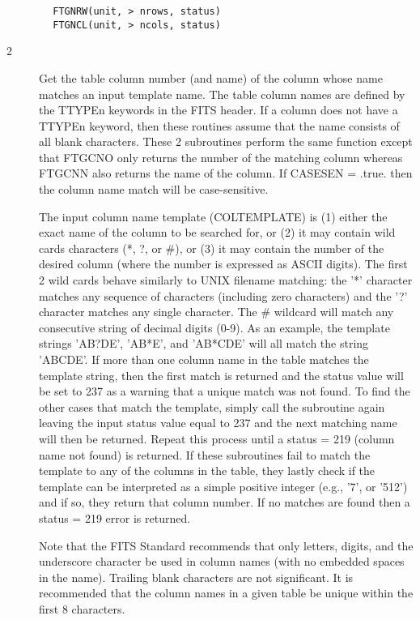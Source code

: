 \documentclass[11pt]{book}
\begin{document}
\begin{verbatim}
        FTGNRW(unit, > nrows, status)
        FTGNCL(unit, > ncols, status)
\end{verbatim}

\begin{description}
\item[2 ] Get the table column number (and name) of the column whose name
matches an input template name.  The table column names are defined by
the TTYPEn keywords in the FITS header.  If a column does not have a
TTYPEn keyword, then these routines assume that the name consists of
all blank characters.  These 2 subroutines perform the same function
except that FTGCNO only returns the number of the matching column whereas
FTGCNN also returns the name of the column.  If CASESEN = .true. then
the column name match will be case-sensitive.

The input column name template (COLTEMPLATE) is (1) either the exact
name of the column to be searched for, or (2) it may contain wild cards
characters (*, ?, or \#), or (3) it may contain the number of the desired
column (where the number is expressed as ASCII digits).  The first 2 wild
cards behave similarly to UNIX filename matching:  the '*' character matches
any sequence of characters (including zero characters) and the '?'
character matches any single character.  The \# wildcard will match
any consecutive string of decimal digits (0-9).  As an example, the template
strings 'AB?DE', 'AB*E', and 'AB*CDE' will all match the string
'ABCDE'.  If more than one column name in the table matches the
template string, then the first match is returned and the status value
will be set to 237 as a warning that a unique match was not found.  To
find the other cases that match the template, simply call the
subroutine again leaving the input status value equal to  237 and the
next matching name will then be returned.  Repeat this process until a
status = 219 (column name not found) is returned.  If these subroutines
fail to match the template to any of the columns in the table, they
lastly check if the template can be interpreted as a simple positive
integer (e.g., '7', or '512') and if so, they return that column
number.  If no matches are found then a status = 219 error is
returned.

Note that the FITS Standard recommends that only letters, digits, and
the underscore character be used in column names (with no embedded
spaces in the name).  Trailing blank characters are not significant.
It is recommended that the column names in a given table be unique
within the first 8 characters.
\end{description}
\end{document}
